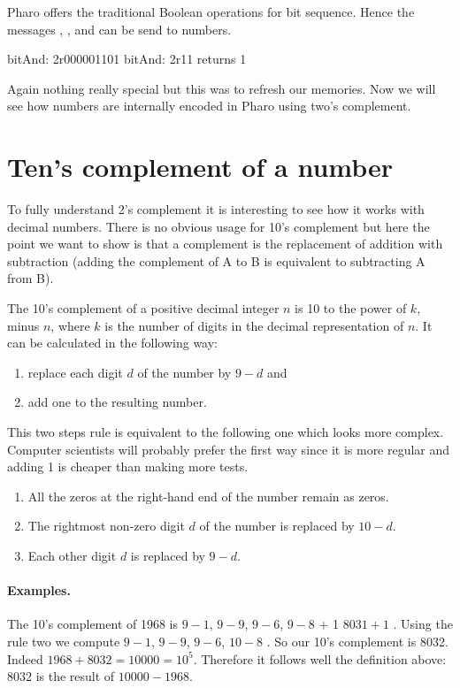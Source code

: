 \documentclass[a4paper,10pt,twoside]{book}
\begin{document}
Pharo offers the traditional Boolean operations for bit sequence. Hence the messages , , and  can be send to numbers. 

\begin{code}{bitAnd:}
2r000001101 bitAnd: 2r11
	returns 1 
\end{code}

Again nothing really special but this was to refresh our memories. Now we will see how numbers are internally encoded in Pharo using two's complement. 

\section{Ten's complement of a number}

To fully understand 2's complement it is interesting to see how it works with decimal numbers. There is no obvious usage for 10's complement but here the point we want to show is that a complement is the replacement of addition with subtraction (\ie adding the complement of A to B is equivalent to subtracting A from B).


The 10's complement of a positive decimal integer $n$ is 10 to the power of $k$, minus $n$, where $k$ is the number of digits in the decimal representation of $n$. It can be calculated in the following way: 

\begin{enumerate}
\item replace each digit $d$ of the number by $9-d$ and  
\item add one to the resulting number.
\end{enumerate}

This two steps rule is equivalent to the following one which looks more complex. Computer scientists will probably prefer the first way since it is more regular and adding 1 is cheaper than making more tests.

\begin{enumerate}
\item All the zeros at the right-hand end of the number remain as zeros. 
\item The rightmost non-zero digit $d$ of the number is replaced by $10 - d$. 
\item Each other digit $d$ is replaced by $9 - d$. 
\end{enumerate}

\paragraph{Examples.}
The 10's complement of 1968 is $9-1$, $9-9$, $9-6$, $9-8$ + 1 \ie $8031 + 1$ . 
Using the rule two we compute $9-1$, $9-9$, $9-6$, $10-8$ . So our 10's complement is 8032. Indeed $1968 + 8032 = 10000 = 10^{5}$. Therefore it follows well the definition above: 8032 is the result of $10000 - 1968$.
\end{document}
